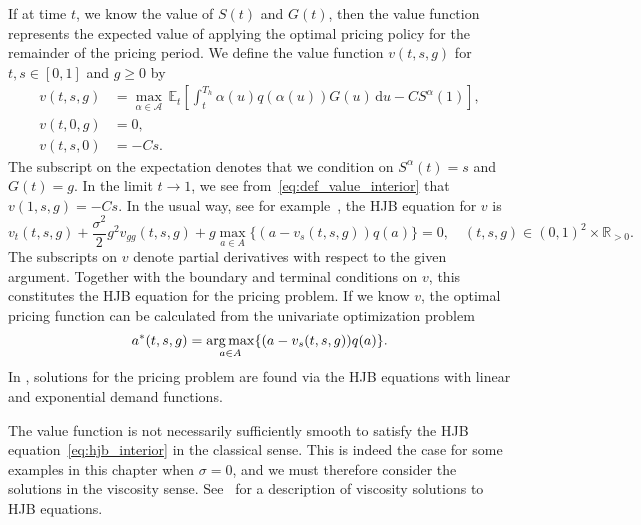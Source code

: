 \documentclass[main.tex]{subfiles}
\begin{document}
If at time $t$, we know the value of $S(t)$ and $G(t)$, then the value
function represents the expected value of applying the optimal pricing
policy for the remainder of the pricing period.
We define the value function $v(t,s,g)$ for $t,s\in[0,1]$ and $g\geq 0$ by
\begin{align}
  v(t,s,g) &=
             \max_{\alpha \in \mathcal A}\,
             \mathbb E_{t}\left[
             \int_t^{T_h}\alpha(u)q(\alpha(u))G(u)\,\mathrm{d}u-CS^\alpha(1)
             \right],\label{eq:def_value_interior}\\
  v(t,0,g)&= 0,\\
  v(t,s,0)&=-Cs.
\end{align}
The subscript on the expectation denotes that we condition on
$S^\alpha(t)=s$ and $G(t)=g$.
In the limit $t\to 1$, we see from~\eqref{eq:def_value_interior} that $v(1,s,g)=-Cs$.
In the usual way, see for example~\cite{pham2009continuous}, the HJB equation for $v$ is
\begin{equation}\label{eq:hjb_interior}
  v_t(t,s,g)+\frac{\sigma^2}{2} g^2v_{gg}(t,s,g)
  +g\max_{a\in A}\{(a-v_s(t,s,g))q(a)\} = 0, \quad
  (t,s,g)\in{(0,1)}^2\times\mathbb R_{>0}.
\end{equation}
The subscripts on $v$ denote partial derivatives with respect to the
given argument. Together with the boundary and terminal conditions on
$v$, this constitutes the HJB equation for the pricing problem.
If we know $v$, the optimal pricing function can be calculated from
the univariate optimization problem
\begin{equation}\label{eq:pricing_function_general}
  a^*(t,s,g) = \operatorname*{arg\,max}_{a\in A}\{(a-v_s(t,s,g))q(a)\}.
\end{equation}
In , solutions for the
pricing problem are found via the HJB equations with linear and
exponential demand functions.
\begin{remark}\label{rem:viscosity}
  The value function is not necessarily sufficiently smooth to satisfy
  the HJB equation~\eqref{eq:hjb_interior} in the classical sense.
  This is indeed the case for some examples in this chapter when $\sigma=0$,
  and we must therefore consider
  the solutions in the viscosity sense. See~\cite{pham2009continuous}
  for a description of viscosity solutions to HJB equations.
\end{remark}
\end{document}
